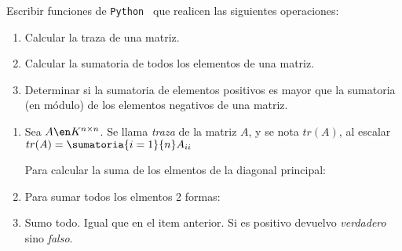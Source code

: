 \begin{enunciado}{\ejercicio}
  Escribir funciones de \texttt{Python \python} que realicen las siguientes operaciones:
  \begin{enumerate}[label=(\alph*)]
    \item Calcular la traza de una matriz.

    \item Calcular la sumatoria de todos los elementos de una matriz.

    \item Determinar si la sumatoria de elementos positivos es mayor que la sumatoria (en módulo)
          de los elementos negativos de una matriz.
  \end{enumerate}
\end{enunciado}

\begin{enumerate}[label=(\alph*)]
  \item Sea $A \en K^{n \times n}$. Se llama \textit{traza} de la matriz $A$, y se nota $tr(A)$, al
        escalar $tr(A) = \sumatoria{i=1}{n}A_{ii}$

        Para calcular la suma de los elmentos de la diagonal principal:
        \copyPaste

  \item Para sumar todos los elmentos 2 formas:

  \item Sumo todo. Igual que en el item anterior. Si es positivo devuelvo \textit{verdadero} sino \textit{falso}.
\end{enumerate}

